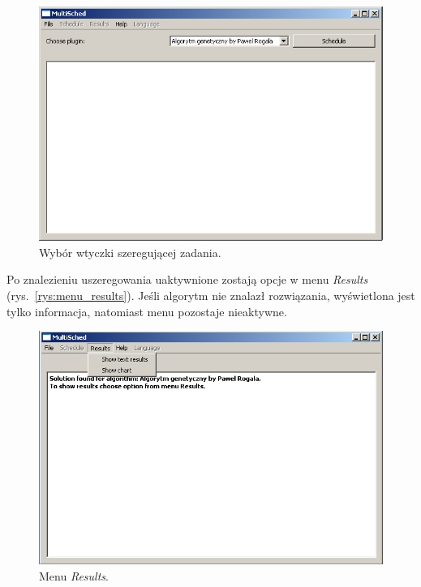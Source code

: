 \begin{figure}[htp]
\centering\includegraphics[scale=0.8]{figures/screens/choose_plugin.png}
\caption{Wybór wtyczki szeregującej zadania.}\label{rys:choose_plugin}
\end{figure}

Po znalezieniu uszeregowania uaktywnione zostają opcje w menu \emph{Results} (rys.~\vref{rys:menu_results}). 
Jeśli algorytm nie znalazł rozwiązania, wyświetlona jest tylko informacja, natomiast menu pozostaje nieaktywne.

\begin{figure}[htp]
\centering\includegraphics[scale=0.8]{figures/screens/menu_results.png}
\caption{Menu \emph{Results}.}\label{rys:menu_results}
\end{figure}

